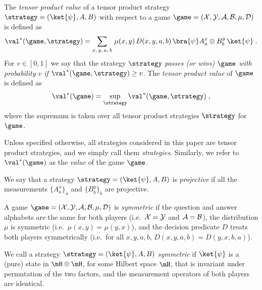 \begin{definition}
  \label{def:tensor-product-value}
	The \emph{tensor product value} of a tensor product strategy $\strategy =
  (\ket{\psi}, A, B)$  with respect to a game $\game=(\cal{X}, \cal{Y}, \cal{A},
  \cal{B}, \mu, D)$ is defined as
  \begin{equation*}
		\val^*(\game, \strategy) = \sum_{x,\, y,\, a,\, b} \, \mu(x,y)\, D(x,y,a,b)\,
    \bra{\psi} A^x_a \otimes B^y_b\, \ket{\psi}\;.
  \end{equation*}
	For $v\in[0,1]$ we say that the strategy $\strategy$ \emph{passes (or wins)
    $\game$ with probability $v$ if} $\val^*(\game, \strategy) \geq v$.
  The \emph{tensor product value} of $\game$ is defined as
  \begin{equation*}
		\val^*(\game) = \sup_\strategy \val^*(\game, \strategy)\;,
  \end{equation*}
	where the supremum is taken over all tensor product strategies $\strategy$ for
  $\game$.
\end{definition}


\begin{remark}
  Unless specified otherwise, all strategies considered in this paper are tensor
  product strategies, and we simply call them \emph{strategies}.
  Similarly, we refer to $\val^*(\game)$ as the \emph{value} of the game
  $\game$.
\end{remark}


\begin{definition}
  \label{def:projective-strategy}
  We say that a strategy $\strategy = (\ket{\psi}, A, B)$ is \emph{projective} if
  all the measurements $\{A^x_a\}_a$ and $\{B^y_b\}_b$ are projective.
\end{definition}

\begin{definition}\label{rem:symmetric-games}
	A game $\game = (\cal{X}, \cal{Y}, \cal{A}, \cal{B}, \mu, D)$ is
  \emph{symmetric} if the question and answer alphabets are the same for both
  players (i.e.\
  $\cal{X} = \cal{Y}$ and $\cal{A} = \cal{B}$), the distribution $\mu$ is
  symmetric (i.e.\
  $\mu(x,y) = \mu(y,x)$), and the decision predicate $D$ treats both players
  symmetrically (i.e.\ for all $x,y,a,b$, $D(x,y,a,b) = D(y,x,b,a)$).
 
We call a strategy $\strategy = (\ket{\psi}, A, B)$
  \emph{symmetric} if $\ket{\psi}$ is a (pure) state in $\mH \otimes \mH$, for some
  Hilbert space $\mH$, that is invariant under permutation of the two factors,
  and the measurement operators of both players are identical.
\end{definition}

